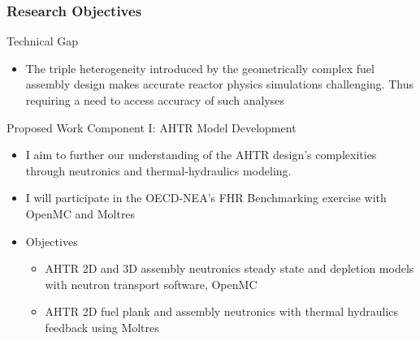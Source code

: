 \begin{frame}
  \frametitle{Research Objectives}
  \begin{block}{Technical Gap}
    \begin{itemize}
      \item The triple heterogeneity introduced by the geometrically complex 
      fuel assembly design makes accurate reactor physics simulations challenging. 
      Thus requiring a need to access accuracy of such analyses 
    \end{itemize}
  \end{block}
  \begin{block}{Proposed Work Component I: AHTR Model Development}
    \begin{itemize}
      \item I aim to further our understanding of the AHTR design's complexities 
      through neutronics and thermal-hydraulics modeling.
      \item I will participate in the OECD-NEA's FHR Benchmarking exercise with 
      OpenMC and Moltres
      \item Objectives 
      \begin{itemize}
        \item AHTR 2D and 3D assembly neutronics steady state and depletion models 
        with neutron transport software, OpenMC
        \item AHTR 2D fuel plank and assembly neutronics with thermal hydraulics 
        feedback using Moltres
      \end{itemize}
    \end{itemize}
  \end{block}
\end{frame}